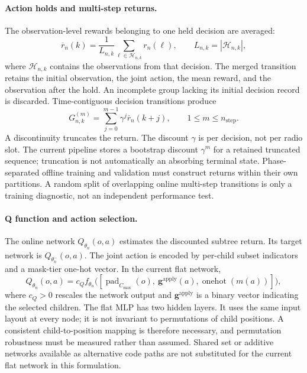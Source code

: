 \begin{EnChapter}
\paragraph{Action holds and multi-step returns.}
The observation-level rewards belonging to one held decision are averaged:
\begin{equation}
  \overline r_n(k)=\frac{1}{L_{n,k}}
            \sum_{\ell\in\mathcal{H}_{n,k}}r_n(\ell),\qquad
            L_{n,k}=|\mathcal{H}_{n,k}|,
  \label{eq:hold-reward}
\end{equation}
where $\mathcal{H}_{n,k}$ contains the observations from that decision.
The merged transition retains the initial observation, the joint action, the
mean reward, and the observation after the hold. An incomplete group lacking
its initial decision record is discarded. Time-contiguous decision transitions
produce
\begin{equation}
  G_{n,k}^{(m)}=\sum_{j=0}^{m-1}\gamma^j\overline r_n(k+j),\qquad 1\le m\le n_{\mathrm{step}}.
  \label{eq:nstep-return}
\end{equation}
A discontinuity truncates the return. The discount $\gamma$ is per decision,
not per radio slot. The current pipeline stores a bootstrap discount $\gamma^m$
for a retained truncated sequence; truncation is not automatically an absorbing
terminal state. Phase-separated offline training and validation must construct
returns within their own partitions. A random split of overlapping online
multi-step transitions is only a training diagnostic, not an independent
performance test.

\paragraph{Q function and action selection.}
The online network $Q_{\theta_n}(o,a)$ estimates the discounted subtree return.
Its target network is $Q_{\theta_n^-}(o,a)$. The joint action is encoded by
per-child subset indicators and a mask-tier one-hot vector. In the current flat
network,
\begin{equation}
  Q_{\theta_n}(o,a)=c_Q f_{\theta_n}
       \bigl([\operatorname{pad}_{C_{\max}}(o),\ \bm g^{\mathrm{apply}}(a),
                   \operatorname{onehot}(m(a))]\bigr),
  \label{eq:q-network}
\end{equation}
where $c_Q>0$ rescales the network output and $\bm g^{\mathrm{apply}}$ is a
binary vector indicating the selected children. The flat MLP has two hidden
layers. It uses the same input layout at every node; it is not invariant to
permutations of child positions. A consistent child-to-position mapping is
therefore necessary, and permutation robustness must be measured rather than
assumed. Shared set or additive networks available as alternative code paths
are not substituted for the current flat network in this formulation.


\end{EnChapter}
